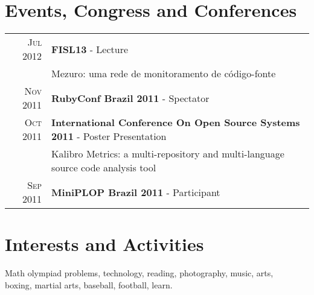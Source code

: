 \documentclass[a4paper,10pt]{article} %
\begin{document}
\section{Events, Congress and Conferences}

\begin{tabular}{rl}
\textsc{Jul} 2012 & \textbf{FISL13} - Lecture\\
& \footnotesize{Mezuro: uma rede de monitoramento de código-fonte}\\

\textsc{Nov} 2011 & \textbf{RubyConf Brazil 2011} - Spectator\\
\textsc{Oct} 2011 & \textbf{International Conference On Open Source Systems 2011} - Poster Presentation\\
& \footnotesize{Kalibro Metrics: a multi-repository and multi-language source code analysis tool}\\
\textsc{Sep} 2011 & \textbf{MiniPLOP Brazil 2011} - Participant


\end{tabular}


\section{Interests and Activities}

Math olympiad problems, technology, reading, photography, music, arts,\\
boxing, martial arts, baseball, football, learn.

\end{document}
